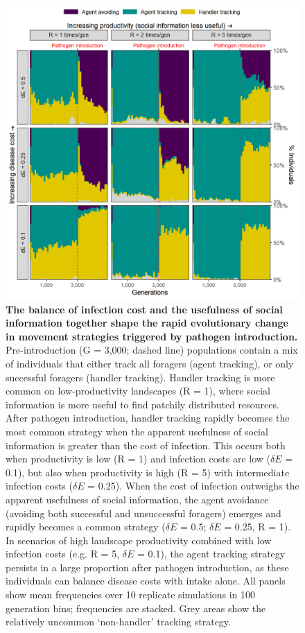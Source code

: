 \begin{figure}[!h]
    \centering
    \includegraphics[width=0.9\linewidth]{figures/pathomove/fig_evo_strategy_default.png}
    \caption{
        \textbf{The balance of infection cost and the usefulness of social information together shape the rapid evolutionary change in movement strategies triggered by pathogen introduction.}
        Pre-introduction (G = 3,000; dashed line) populations contain a mix of individuals that either track all foragers (agent tracking), or only successful foragers (handler tracking).
        Handler tracking is more common on low-productivity landscapes (R = 1), where social information is more useful to find patchily distributed resources.
        After pathogen introduction, handler tracking rapidly becomes the most common strategy when the apparent usefulness of social information is greater than the cost of infection.
        This occurs both when productivity is low (R = 1) and infection costs are low ($\delta E$ = 0.1), but also when productivity is high (R = 5) with intermediate infection costs ($\delta E$ = 0.25).
        When the cost of infection outweighs the apparent usefulness of social information, the agent avoidance (avoiding both successful and unsuccessful foragers) emerges and rapidly becomes a common strategy ($\delta E$ = 0.5; $\delta E$ = 0.25, R = 1).
        In scenarios of high landscape productivity combined with low infection costs (e.g. R = 5, $\delta E$ = 0.1), the agent tracking strategy persists in a large proportion after pathogen introduction, as these individuals can balance disease costs with intake alone.
        All panels show mean frequencies over 10 replicate simulations in 100 generation bins; frequencies are stacked.
        Grey areas show the relatively uncommon `non-handler' tracking strategy.
    }\label{fig_evo_strategy}
\end{figure}

